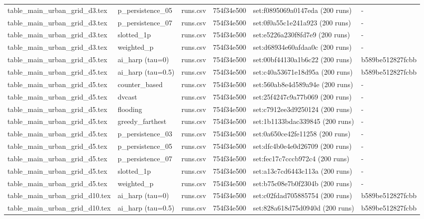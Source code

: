 \begin{tabular}{llllll}
table\_main\_urban\_grid\_d3.tex & p\_persistence\_05 & runs.csv & 754f34e500 & set:f0895069a0147eda (200 runs) & - \\
table\_main\_urban\_grid\_d3.tex & p\_persistence\_07 & runs.csv & 754f34e500 & set:0f0a55c1e241a923 (200 runs) & - \\
table\_main\_urban\_grid\_d3.tex & slotted\_1p & runs.csv & 754f34e500 & set:e5226a230f8fd7e9 (200 runs) & - \\
table\_main\_urban\_grid\_d3.tex & weighted\_p & runs.csv & 754f34e500 & set:d68934e60afdaa0c (200 runs) & - \\
table\_main\_urban\_grid\_d5.tex & ai\_harp (tau=0) & runs.csv & 754f34e500 & set:00bf44130a1b6c22 (200 runs) & b589be512827fcbb \\
table\_main\_urban\_grid\_d5.tex & ai\_harp (tau=0.5) & runs.csv & 754f34e500 & set:c40a53671e18d95a (200 runs) & b589be512827fcbb \\
table\_main\_urban\_grid\_d5.tex & counter\_based & runs.csv & 754f34e500 & set:560ab8e4d589a94e (200 runs) & - \\
table\_main\_urban\_grid\_d5.tex & dvcast & runs.csv & 754f34e500 & set:25f4247c9a77b069 (200 runs) & - \\
table\_main\_urban\_grid\_d5.tex & flooding & runs.csv & 754f34e500 & set:c7912ee3d9250124 (200 runs) & - \\
table\_main\_urban\_grid\_d5.tex & greedy\_farthest & runs.csv & 754f34e500 & set:1b1133bdac339845 (200 runs) & - \\
table\_main\_urban\_grid\_d5.tex & p\_persistence\_03 & runs.csv & 754f34e500 & set:0a650ce42fe11258 (200 runs) & - \\
table\_main\_urban\_grid\_d5.tex & p\_persistence\_05 & runs.csv & 754f34e500 & set:dfc4b0e4e0d26709 (200 runs) & - \\
table\_main\_urban\_grid\_d5.tex & p\_persistence\_07 & runs.csv & 754f34e500 & set:fec17c7cccb972c4 (200 runs) & - \\
table\_main\_urban\_grid\_d5.tex & slotted\_1p & runs.csv & 754f34e500 & set:a13c7cd6443c113a (200 runs) & - \\
table\_main\_urban\_grid\_d5.tex & weighted\_p & runs.csv & 754f34e500 & set:b75c08e7b0f2304b (200 runs) & - \\
table\_main\_urban\_grid\_d10.tex & ai\_harp (tau=0) & runs.csv & 754f34e500 & set:c02fdad705885754 (200 runs) & b589be512827fcbb \\
table\_main\_urban\_grid\_d10.tex & ai\_harp (tau=0.5) & runs.csv & 754f34e500 & set:828a618d75d0940d (200 runs) & b589be512827fcbb \\

\end{tabular}
